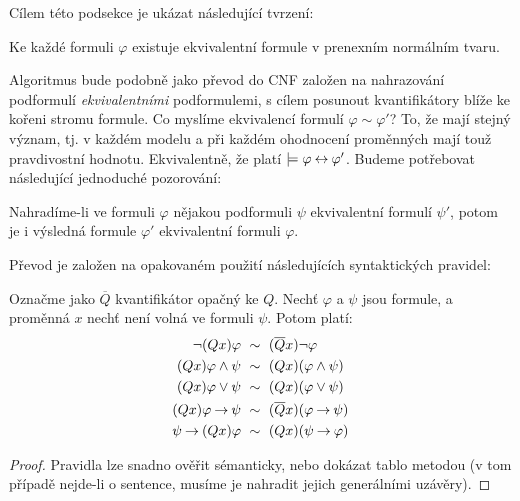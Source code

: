 Cílem této podsekce je ukázat následující tvrzení:

\begin{proposition}\label{proposition:convert-to-pnf}
    Ke každé formuli $\varphi$ existuje ekvivalentní formule v prenexním normálním tvaru.    
\end{proposition}

Algoritmus bude podobně jako převod do CNF založen na nahrazování podformulí \emph{ekvivalentními} podformulemi, s cílem posunout kvantifikátory blíže ke kořeni stromu formule. Co myslíme ekvivalencí formulí $\varphi\sim\varphi'$? To, že mají stejný význam, tj. v každém modelu a při každém ohodnocení proměnných mají touž pravdivostní hodnotu. Ekvivalentně, že platí $\models\varphi\mathbin{\leftrightarrow}\varphi'$. Budeme potřebovat následující jednoduché pozorování:

\begin{observation}\label{observation:pnf-one-step}
    Nahradíme-li ve formuli $\varphi$ nějakou podformuli $\psi$ ekvivalentní formulí $\psi'$, potom je i výsledná formule $\varphi'$ ekvivalentní formuli $\varphi$.
\end{observation}

Převod je založen na opakovaném použití následujících syntaktických pravidel:

\begin{lemma}\label{lemma:pnf-conversion-rules}
    Označme jako $\overline{Q}$ kvantifikátor opačný ke $Q$. Nechť $\varphi$ a $\psi$ jsou formule, a proměnná $x$ nechť není volná ve formuli $\psi$. Potom platí:
    \begin{align*}
        \neg (Qx)\varphi\ &\sim\ (\overline{Q}x)\neg\varphi\\
        (Qx)\varphi \land \psi\ &\sim\ (Qx)(\varphi \land \psi)\\
        (Qx)\varphi \lor \psi\ &\sim\ (Qx)(\varphi \lor \psi)\\
        (Qx)\varphi \mathbin{\rightarrow} \psi\ &\sim\ (\overline{Q}x)(\varphi \mathbin{\rightarrow} \psi)\\
        \psi \mathbin{\rightarrow} (Qx)\varphi\ &\sim\ (Qx)(\psi \mathbin{\rightarrow} \varphi)
    \end{align*}
\end{lemma}
\begin{proof}
    Pravidla lze snadno ověřit sémanticky, nebo dokázat tablo metodou (v tom případě nejde-li o sentence, musíme je nahradit jejich generálními uzávěry).   
\end{proof}

